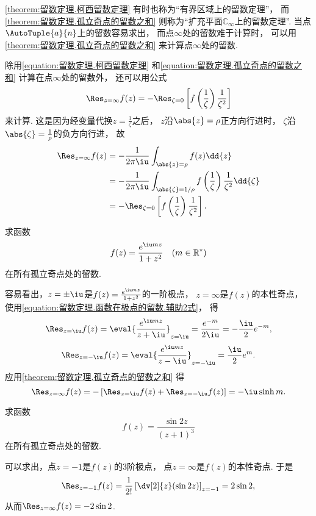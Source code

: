 \cref{theorem:留数定理.柯西留数定理}
有时也称为“有界区域上的留数定理”，
而\cref{theorem:留数定理.孤立奇点的留数之和}
则称为“扩充平面\(\mathbb{C}_\infty\)上的留数定理”.
当点\(\AutoTuple{a}{n}\)上的留数容易求出，
而点\(\infty\)处的留数难于计算时，
可以用\cref{theorem:留数定理.孤立奇点的留数之和}
来计算点\(\infty\)处的留数.

除用\cref{equation:留数定理.柯西留数定理}
和\cref{equation:留数定理.孤立奇点的留数之和}
计算在点\(\infty\)处的留数外，
还可以用公式\begin{equation}
	\Res_{z=\infty} f(z)
	= -\Res_{\zeta=0}
	\left[
		f\left(\frac{1}{\zeta}\right) \frac{1}{\zeta^2}
	\right]
\end{equation}来计算.
这是因为经变量代换\(z = \frac{1}{\zeta}\)之后，
\(z\)沿\(\abs{z}=\rho\)正方向行进时，
\(\zeta\)沿\(\abs{\zeta}=\frac{1}{\rho}\)的负方向行进，
故\begin{align*}
	\Res_{z=\infty} f(z)
	&= -\frac{1}{2\pi\iu}
		\int_{\abs{z}=\rho} f(z) \dd{z} \\
	&= -\frac{1}{2\pi\iu}
		\int_{\abs{\zeta}=1/\rho}
		f\left(\frac{1}{\zeta}\right)
		\frac{1}{\zeta^2} \dd{\zeta} \\
	&= -\Res_{\zeta=0} \left[ f\left(\frac{1}{\zeta}\right) \frac{1}{\zeta^2} \right].
\end{align*}

\begin{example}
求函数\[
	f(z) = \frac{e^{\iu mz}}{1+z^2} \quad(m\in\mathbb{R}^*)
\]在所有孤立奇点处的留数.
\begin{solution}
容易看出，\(z=\pm\iu\)是\(f(z) = \frac{e^{\iu mz}}{1+z^2}\)的一阶极点，
\(z=\infty\)是\(f(z)\)的本性奇点，
使用\cref{equation:留数定理.函数在极点的留数.辅助2式}，
得\[
	\Res_{z=\iu} f(z)
	= \eval{\frac{e^{\iu mz}}{z+\iu}}_{z=\iu}
	= \frac{e^{-m}}{2\iu}
	= -\frac{\iu}{2} e^{-m},
\]\[
	\Res_{z=-\iu} f(z)
	= \eval{\frac{e^{\iu mz}}{z-\iu}}_{z=-\iu}
	= \frac{\iu}{2} e^m.
\]
应用\cref{theorem:留数定理.孤立奇点的留数之和} 得\[
	\Res_{z=\infty} f(z)
	= -\left[ \Res_{z=\iu} f(z) + \Res_{z=-\iu} f(z) \right]
	= -\iu \sinh m.
\]
\end{solution}
\end{example}

\begin{example}
求函数\[
	f(z) = \frac{\sin 2z}{(z+1)^3}
\]在所有孤立奇点处的留数.
\begin{solution}
可以求出，点\(z=-1\)是\(f(z)\)的3阶极点，
点\(z=\infty\)是\(f(z)\)的本性奇点.
于是\[
	\Res_{z=-1} f(z)
	= \frac{1}{2!} \left[ \dv[2]{z}(\sin 2z) \right]_{z=-1}
	= 2 \sin 2,
\]
从而\(\Res_{z=\infty} f(z) = -2 \sin 2\).
\end{solution}
\end{example}

